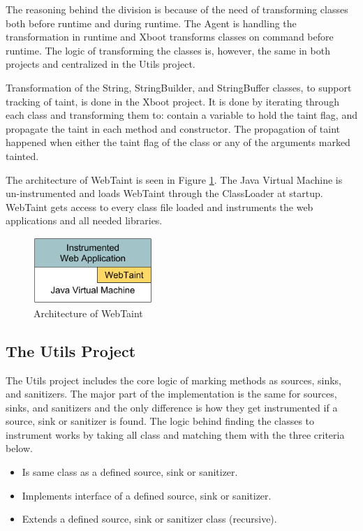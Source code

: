 The reasoning behind the division is because of the need of transforming classes both before runtime and during runtime. The Agent is handling the transformation in runtime and Xboot transforms classes on command before runtime. The logic of transforming the classes is, however, the same in both projects and centralized in the Utils project.

Transformation of the String, StringBuilder, and StringBuffer classes, to support tracking of taint, is done in the Xboot project. It is done by iterating through each class and transforming them to: contain a variable to hold the taint flag, and propagate the taint in each method and constructor. The propagation of taint happened when either the taint flag of the class or any of the arguments marked tainted.

The architecture of WebTaint is seen in Figure \ref{fig:WebTaint}. The Java Virtual Machine is un-instrumented and loads WebTaint through the ClassLoader at startup. WebTaint gets access to every class file loaded and instruments the web applications and all needed libraries.

\begin{figure}[H]
    \centering
    \includegraphics[width=0.4\textwidth]{images/WebTaintArchitecture.png}
    \caption{Architecture of WebTaint}
    \label{fig:WebTaint}
\end{figure}



\subsection{The Utils Project}
The Utils project includes the core logic of marking methods as sources, sinks, and sanitizers. The major part of the implementation is the same for sources, sinks, and sanitizers and the only difference is how they get instrumented if a source, sink or sanitizer is found. The logic behind finding the classes to instrument works by taking all class and matching them with the three criteria below.

\hfill
\begin{itemize}
    \item Is same class as a defined source, sink or sanitizer.
    \item Implements interface of a defined source, sink or sanitizer.
    \item Extends a defined source, sink or sanitizer class (recursive).
\end{itemize}
\hfill


